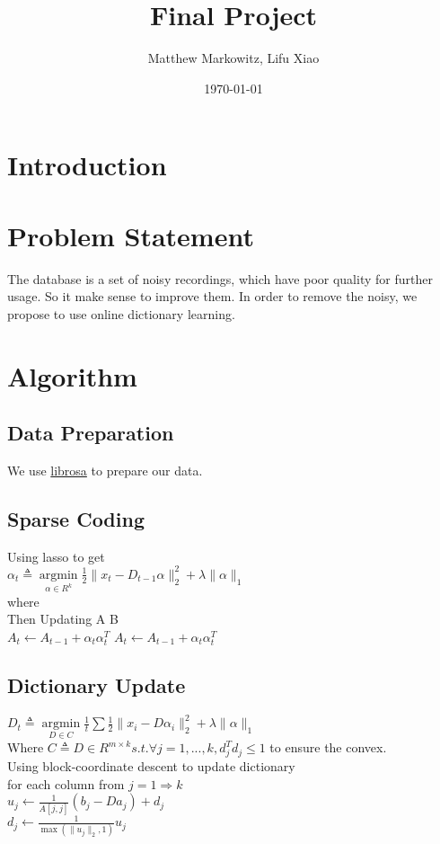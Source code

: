 \documentclass[UTF8]{article}
\title{Final Project}
\author{Matthew Markowitz, Lifu Xiao}
\date{\today}
\begin{document}
    \maketitle
    \section{Introduction}

    \section{Problem Statement}
    The database is a set of noisy recordings, which have poor quality for further usage. So it make sense  to improve them. In order to remove the noisy, we propose to use online dictionary learning.
    \section{Algorithm}
    \subsection{Data Preparation}
    We use \href{https://librosa.github.io/librosa/}{librosa} to prepare our data.
    \subsection{Sparse Coding}
    Using lasso to get
    \\[1.5mm]
    $\alpha_t \triangleq \mathop{\arg\min}\limits_{\alpha\in R^k} \frac{1}{2} \| x_t - D_{t-1} \alpha  \|^2_2 + \lambda \|\alpha\|_1 $
    \\[1.5mm]
    where
    \\[1.5mm]
    Then Updating A B
    \\[1.5mm]
    $A_t \leftarrow A_{t-1} + \alpha_t \alpha_t^T$
    $A_t \leftarrow A_{t-1} + \alpha_t \alpha_t^T$
    \subsection{Dictionary Update}
    $D_t \triangleq \mathop{\arg\min}\limits_{D \in C} \frac{1}{t} \sum{ \frac{1}{2} \| x_i - D \alpha_i  \|^2_2 + \lambda \|\alpha\|_1} $
    \\[1.5mm]
    Where $C \triangleq {D \in R^{m\times k} s.t. \forall j = 1, ..., k, d_j^Td_j \leq 1}$ to ensure the convex.
    \\[1.5mm]
    Using block-coordinate descent to update dictionary
    \\[1.5mm]
    for each column from $j = 1 \Rightarrow k$
    \\[1.5mm]
    $u_j \leftarrow \frac{1}{A[j, j]}(b_j - Da_j) + d_j$
    \\[1.5mm]
    $d_j \leftarrow \frac{1}{\max(\|u_j\|_2, 1)}u_j$

    
\end{document}
